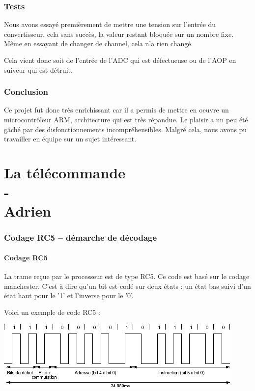 \documentclass[a4paper]{report}
\begin{document}
\section{Tests}
Nous avons essayé premièrement de mettre une tension sur l'entrée du convertisseur, cela sans succès, la valeur restant bloquée sur un nombre fixe. Même en essayant de changer de channel, cela n'a rien changé.

Cela vient donc soit de l'entrée de l'ADC qui est défectueuse ou de l'AOP en suiveur qui est détruit.

\section{Conclusion}
Ce projet fut donc très enrichissant car il a permis de mettre en oeuvre un microcontrôleur ARM, architecture qui est très répandue. Le plaisir a un peu été gâché par des disfonctionnements incompréhensibles. Malgré cela, nous avons pu travailler en équipe sur un sujet intéressant.


\part{La télécommande\\-\\Adrien {}}
\section{Codage RC5 – démarche de décodage}
\subsection{Codage RC5}
La trame reçue par le processeur est de type RC5. Ce code est basé sur le codage manchester.
C'est à dire qu'un bit est codé sur deux états : un état bas suivi d'un état haut pour le '1' et l'inverse pour le '0'.

Voici un exemple de code RC5 :

\begin{center}
	\includegraphics[scale=0.6]{images/RC_rc5.png}
\end{center}
\end{document}
